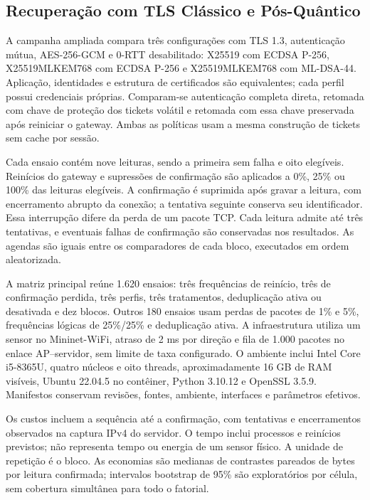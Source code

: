 \subsection{Recuperação com TLS Clássico e Pós-Quântico}
\label{sec:continuidade_tls}

A campanha ampliada compara três configurações com TLS 1.3, autenticação mútua, AES-256-GCM e 0-RTT desabilitado: X25519 com ECDSA P-256, X25519MLKEM768 com ECDSA P-256 e X25519MLKEM768 com ML-DSA-44. Aplicação, identidades e estrutura de certificados são equivalentes; cada perfil possui credenciais próprias. Comparam-se autenticação completa direta, retomada com chave de proteção dos tickets volátil e retomada com essa chave preservada após reiniciar o gateway. Ambas as políticas usam a mesma construção de tickets sem cache por sessão.

Cada ensaio contém nove leituras, sendo a primeira sem falha e oito elegíveis. Reinícios do gateway e supressões de confirmação são aplicados a 0\%, 25\% ou 100\% das leituras elegíveis. A confirmação é suprimida após gravar a leitura, com encerramento abrupto da conexão; a tentativa seguinte conserva seu identificador. Essa interrupção difere da perda de um pacote TCP. Cada leitura admite até três tentativas, e eventuais falhas de confirmação são conservadas nos resultados. As agendas são iguais entre os comparadores de cada bloco, executados em ordem aleatorizada.

A matriz principal reúne 1.620 ensaios: três frequências de reinício, três de confirmação perdida, três perfis, três tratamentos, deduplicação ativa ou desativada e dez blocos. Outros 180 ensaios usam perdas de pacotes de 1\% e 5\%, frequências lógicas de 25\%/25\% e deduplicação ativa. A infraestrutura utiliza um sensor no Mininet-WiFi, atraso de 2 ms por direção e fila de 1.000 pacotes no enlace AP--servidor, sem limite de taxa configurado. O ambiente inclui Intel Core i5-8365U, quatro núcleos e oito threads, aproximadamente 16 GB de RAM visíveis, Ubuntu 22.04.5 no contêiner, Python 3.10.12 e OpenSSL 3.5.9. Manifestos conservam revisões, fontes, ambiente, interfaces e parâmetros efetivos.

Os custos incluem a sequência até a confirmação, com tentativas e encerramentos observados na captura IPv4 do servidor. O tempo inclui processos e reinícios previstos; não representa tempo ou energia de um sensor físico. A unidade de repetição é o bloco. As economias são medianas de contrastes pareados de bytes por leitura confirmada; intervalos bootstrap de 95\% são exploratórios por célula, sem cobertura simultânea para todo o fatorial.

